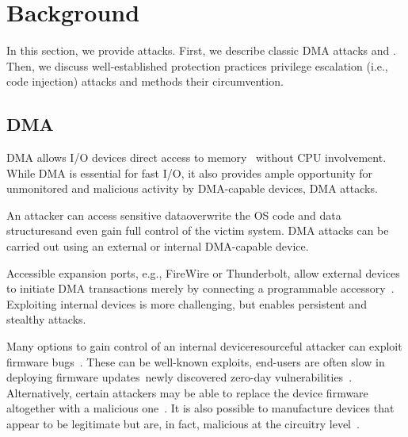 \section{Background}\label{sec:background}

In this section, we provide \DIFdelbegin {}\DIFdelend \DIFaddbegin {}\DIFaddend attacks. First, we describe classic DMA attacks and \DIFdelbegin {}\DIFdelend \DIFaddbegin {}\DIFaddend . Then, we discuss well-established protection practices \DIFdelbegin {}\DIFdelend \DIFaddbegin {}\DIFaddend privilege escalation (i.e., code injection) attacks and methods \DIFdelbegin {}\DIFdelend \DIFaddbegin {}\DIFaddend their circumvention.

\subsection{DMA \DIFdelbegin {}\DIFdelend \DIFaddbegin {}\DIFaddend }

DMA allows I/O devices direct access to memory~\cite{oC54} without CPU involvement. While DMA is essential for fast I/O, it also provides ample opportunity for unmonitored and malicious activity by DMA-capable devices, \DIFdelbegin {}\DIFdelend \DIFaddbegin {}\DIFaddend DMA attacks. 

An attacker can access sensitive data\DIFdelbegin {}\DIFdelend \DIFaddbegin \DIFadd{, }\DIFaddend overwrite the OS code and data structures\DIFaddbegin \DIFadd{, }\DIFaddend and even gain full control of the victim system. DMA attacks can be carried out using an external or internal DMA-capable device. 

Accessible expansion ports, e.g., FireWire or Thunderbolt, allow external devices to initiate DMA transactions merely by connecting a programmable accessory~\cite{Dor04, Vol, MM, thunder}. 
Exploiting internal devices is more challenging, but enables persistent and stealthy attacks. 

Many options \DIFaddbegin {}\DIFaddend to gain control of an internal device\DIFdelbegin {}\DIFdelend \DIFaddbegin {}\DIFaddend resourceful attacker can exploit firmware bugs~\cite{SB12}. These can be well-known exploits, \DIFdelbegin {}\DIFdelend \DIFaddbegin {}\DIFaddend end-users are often slow in deploying firmware updates~\cite{DPVL10}\DIFdelbegin {}\DIFdelend \DIFaddbegin {}\DIFaddend newly discovered zero-day vulnerabilities~\cite{Ben17b}. Alternatively, certain attackers may be able to replace the device firmware altogether with a malicious one~\cite{ZKB13, NL14}. It is also possible to manufacture devices that appear to be legitimate but are, in fact, malicious at the circuitry level~\cite{YHD16}.

